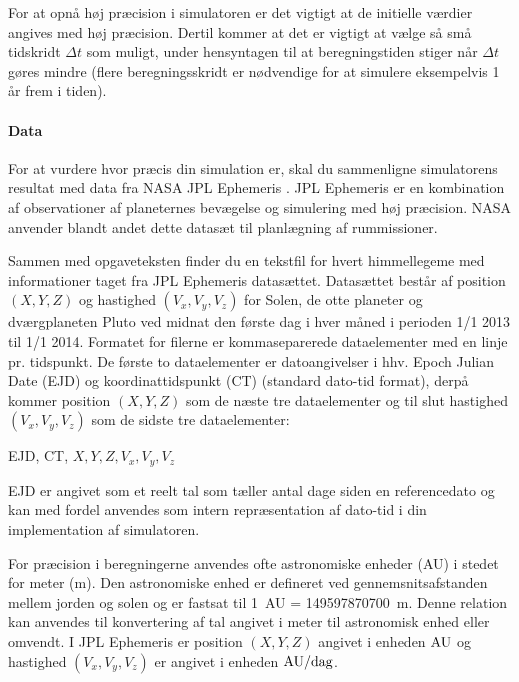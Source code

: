 \documentclass{article}
\begin{document}
\begin{enumerate}[label=11g.\arabic*,start=0]
For at opnå høj præcision i simulatoren er det vigtigt at de initielle værdier angives med høj præcision. Dertil kommer at det er vigtigt at vælge så små tidskridt $\Delta t$ som muligt, under hensyntagen til at beregningstiden stiger når $\Delta t$ gøres mindre (flere beregningsskridt er nødvendige for at simulere eksempelvis 1 år frem i tiden).

\paragraph{Data}
For at vurdere hvor præcis din simulation er, skal du sammenligne simulatorens resultat med data fra NASA JPL Ephemeris \cite{JPL}. JPL Ephemeris er en kombination af observationer af planeternes bevægelse og simulering med høj præcision. NASA anvender blandt andet dette datasæt til planlægning af rummissioner.

Sammen med opgaveteksten finder du en tekstfil for hvert himmellegeme med informationer taget fra JPL Ephemeris datasættet. Datasættet består af position $(X,Y,Z)$ og hastighed $(V_x, V_y, V_z)$ for Solen, de otte planeter og dværgplaneten Pluto ved midnat den første dag i hver måned i perioden 1/1 2013 til 1/1 2014. Formatet for filerne er kommaseparerede dataelementer med en linje pr. tidspunkt. De første to dataelementer er datoangivelser i hhv. Epoch Julian Date (EJD) og koordinattidspunkt (CT) (standard dato-tid format), derpå kommer position $(X,Y,Z)$ som de næste tre dataelementer og til slut hastighed $(V_x, V_y, V_z)$ som de sidste tre dataelementer:
\begin{center}
  EJD, CT, $X, Y, Z, V_x, V_y, V_z$
\end{center}
EJD er angivet som et reelt tal som tæller antal dage siden en referencedato og kan med fordel anvendes som intern repræsentation af dato-tid i din implementation af simulatoren.

For præcision i beregningerne anvendes ofte astronomiske enheder (AU) i stedet for meter (m). Den astronomiske enhed er defineret ved gennemsnitsafstanden mellem jorden og solen og er fastsat til 1~AU = 149597870700~m. Denne relation kan anvendes til konvertering af tal angivet i meter til astronomisk enhed eller omvendt. I JPL Ephemeris er position $(X,Y,Z)$ angivet i enheden $\mathrm{AU}$ og hastighed $(V_x, V_y, V_z)$ er angivet i enheden $\mathrm{AU} / \mathrm{dag}$.


\end{enumerate}
\end{document}
